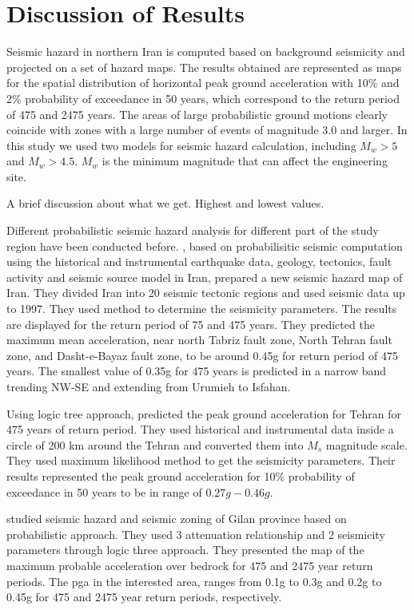 \newpage
\section{Discussion of Results}
Seismic hazard in northern Iran is computed based on background seismicity and projected on a set of hazard maps. The results obtained are represented as maps for the spatial distribution of horizontal peak ground acceleration with 10\% and 2\% probability of exceedance in 50 years, which correspond to the return period of 475 and 2475 years. The areas of large probabilistic ground motions clearly coincide with zones with a large number of events of magnitude 3.0 and larger. In this study we used two models for seismic hazard calculation, including $M_w>5$ and $M_w>4.5$. $M_w$ is the minimum magnitude that can affect the engineering site.


A brief discussion about what we get. Highest and lowest values.

\noindent
Different probabilistic seismic hazard analysis for different part of the study region have been conducted before. 
\citet{Tavakoli1999}, based on probabilisitic seismic computation using the historical and instrumental earthquake data, geology, tectonics, fault activity and seismic source model in Iran, prepared a new seismic hazard map of Iran. They divided Iran into 20 seismic tectonic regions and used seismic data up to 1997. They used \citet{Kijko1992} method  to determine the seismicity parameters.
The results are displayed for the return period of 75 and 475 years. They predicted the maximum mean acceleration, near north Tabriz fault zone, North Tehran fault zone, and Dasht-e-Bayaz fault zone, to be around 0.45g for return period of 475 years. The smallest value of 0.35g for 475 years is predicted in a narrow band trending NW-SE and extending from Urumieh to Isfahan.  

\noindent
Using logic tree approach,\citet{Ghodrati2003} predicted the peak ground acceleration for Tehran for 475 years of return period. They used historical and instrumental data inside a circle of 200 km around the Tehran and converted them into $M_s$ magnitude scale. They used maximum likelihood method to get the seismicity parameters. Their results represented the peak ground acceleration for 10\% probability of exceedance in 50 years to be in range of $0.27g - 0.46g$.

\noindent
\citet{Ghodrati2008} studied seismic hazard and seismic zoning of Gilan province based on probabilistic approach. They used 3 attenuation relationship and 2 seismicity parameters through logic three approach. They presented the map of the maximum probable acceleration over bedrock for 475 and 2475 year return periods. The pga in the interested area, ranges from 0.1g to 0.3g and 0.2g to 0.45g for 475 and 2475 year return periods, respectively. 


